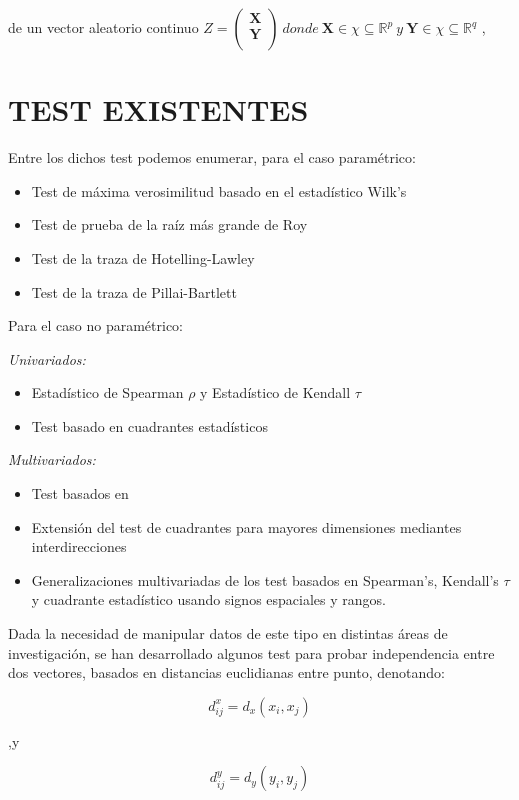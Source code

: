 \documentclass[]{book}
\providecommand{\tightlist}{%
  \setlength{\itemsep}{0pt}\setlength{\parskip}{0pt}}
\begin{document}
de un vector aleatorio continuo
\(\begin{equation} Z = \mathbf{\begin{pmatrix} X\\ Y\\ \end{pmatrix}} \ donde \ \mathbf{X} \in \chi \subseteq \mathbb{R}^p \ y \ \mathbf{Y} \in \chi \subseteq \mathbb{R}^q \end{equation}\)
,

\section{TEST EXISTENTES}\label{test-existentes}

Entre los dichos test podemos enumerar, para el caso paramétrico:

\begin{itemize}
\tightlist
\item
  Test de máxima verosimilitud basado en el estadístico Wilk's
\item
  Test de prueba de la raíz más grande de Roy
\item
  Test de la traza de Hotelling-Lawley
\item
  Test de la traza de Pillai-Bartlett
\end{itemize}

Para el caso no paramétrico:

\emph{Univariados:}

\begin{itemize}
\tightlist
\item
  Estadístico de Spearman \(\rho\) y Estadístico de Kendall \(\tau\)
\item
  Test basado en cuadrantes estadísticos
\end{itemize}

\emph{Multivariados:}

\begin{itemize}
\tightlist
\item
  Test basados en\\
\item
  Extensión del test de cuadrantes para mayores dimensiones mediantes
  interdirecciones
\item
  Generalizaciones multivariadas de los test basados en Spearman's,
  Kendall's \(\tau\) y cuadrante estadístico usando signos espaciales y
  rangos.
\end{itemize}

Dada la necesidad de manipular datos de este tipo en distintas áreas de
investigación, se han desarrollado algunos test para probar
independencia entre dos vectores, basados en distancias euclidianas
entre punto, denotando:

\[ \begin{equation} 
d_{ij}^x = d_x(x_i, x_j)   
\end{equation} \]

,y

\[ \begin{equation} 
d_{ij}^y = d_y(y_i, y_j)
\end{equation} \]


\end{document}
